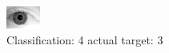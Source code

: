 \begin{figure}[h!]
\begin{center}
\includegraphics[width=0.60\columnwidth]{figures/ID2116_class_4_target_3.png}
\end{center}
\caption{ Classification: 4 actual target: 3}
\label{fig:ID2116_class_4_target_3}
\end{figure}
